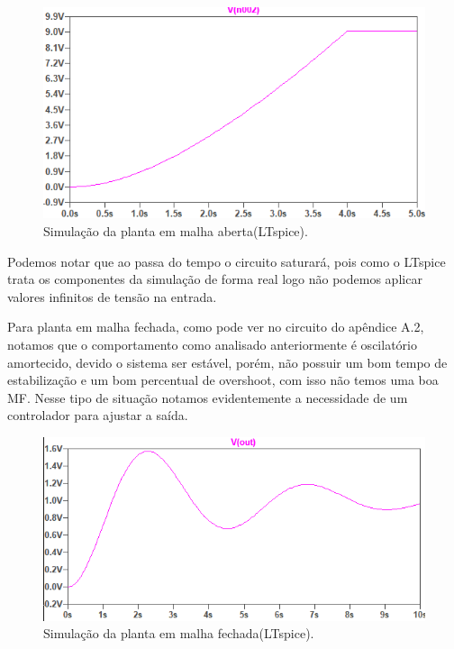 \begin{figure}[H]
\begin{center}
    \includegraphics[width=12cm]{images/PD_pratico/OL.png}  
\end{center}
\caption{Simulação da planta em malha aberta(LTspice).}
\label{OL} 
\end{figure}

Podemos notar que ao passa do tempo o circuito saturará, pois como o LTspice trata os componentes da simulação de forma real logo não podemos aplicar valores infinitos de tensão na entrada.

Para planta em malha fechada, como pode ver no circuito do apêndice A.2, notamos que o comportamento como analisado anteriormente é oscilatório amortecido, devido o sistema ser estável, porém, não possuir um bom tempo de estabilização e um bom percentual de overshoot, com isso não temos uma boa MF. Nesse tipo de situação notamos evidentemente a necessidade de um controlador para ajustar a saída.  


\begin{figure}[H]
\begin{center}
    \includegraphics[width=12cm]{images/PD_pratico/CL.png}  
\end{center}
\caption{Simulação da planta em malha fechada(LTspice).}
\label{CL} 
\end{figure}

